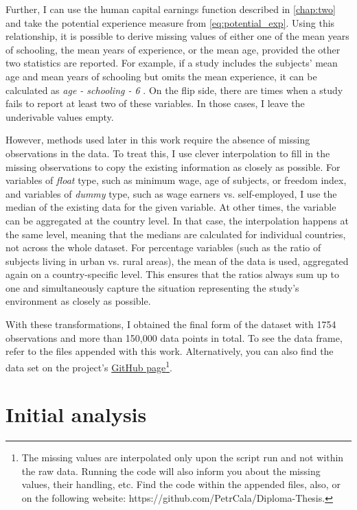 Further, I can use the human capital earnings function described in \autoref{chap:two} and take the potential experience measure from \autoref{eq:potential_exp}. Using this relationship, it is possible to derive missing values of either one of the mean years of schooling, the mean years of experience, or the mean age, provided the other two statistics are reported. For example, if a study includes the subjects' mean age and mean years of schooling but omits the mean experience, it can be calculated as \textit{age - schooling - 6} \citep{mincer1974schooling}. On the flip side, there are times when a study fails to report at least two of these variables. In those cases, I leave the underivable values empty.

However, methods used later in this work require the absence of missing observations in the data. To treat this, I use clever interpolation to fill in the missing observations to copy the existing information as closely as possible. For variables of \textit{float} type, such as minimum wage, age of subjects, or freedom index, and variables of \textit{dummy} type, such as wage earners vs. self-employed, I use the median of the existing data for the given variable. At other times, the variable can be aggregated at the country level. In that case, the interpolation happens at the same level, meaning that the medians are calculated for individual countries, not across the whole dataset. For percentage variables (such as the ratio of subjects living in urban vs. rural areas), the mean of the data is used, aggregated again on a country-specific level. This ensures that the ratios always sum up to one and simultaneously capture the situation representing the study's environment as closely as possible.

With these transformations, I obtained the final form of the dataset with 1754 observations and more than 150,000 data points in total. To see the data frame, refer to the files appended with this work. Alternatively, you can also find the data set on the project's \href{https://github.com/PetrCala/Diploma-Thesis}{GitHub page}\footnote{The missing values are interpolated only upon the script run and not within the raw data. Running the code will also inform you about the missing values, their handling, etc. Find the code within the appended files, also, or on the following website: https://github.com/PetrCala/Diploma-Thesis.}.

\section{Initial analysis}
\label{sec:initial_analysis}


